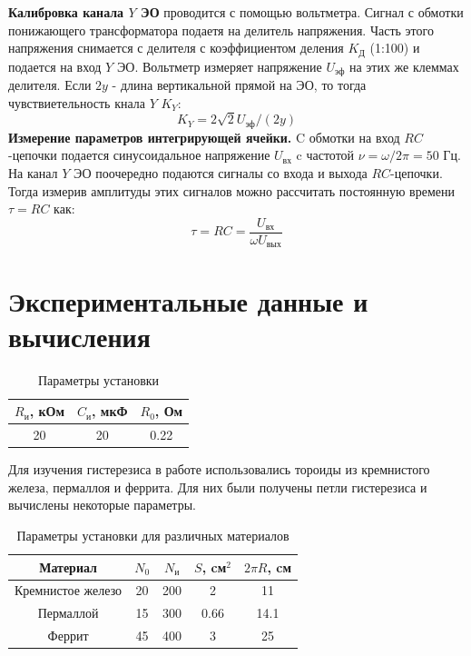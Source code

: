\indent \textbf{Калибровка канала $Y$ ЭО} проводится с помощью вольтметра. Сигнал с обмотки понижающего трансформатора подаетя на делитель напряжения. Часть этого напряжения снимается с делителя с коэффициентом деления $K_{Д}$ (1:100) и подается на вход $Y$ ЭО. Вольтметр измеряет напряжение $U_{\text{эф}}$ на этих же клеммах делителя. Если $2y$ - длина вертикальной прямой на ЭО, то тогда чувствиетельность кнала $Y$ $K_Y$:
\begin{equation}
    K_Y = 2\sqrt{2}U_{\text{эф}}/(2y) \label{eq:Ky}
\end{equation}
\indent \textbf{Измерение параметров интегрирующей ячейки.} C обмотки на вход $RC$-цепочки подается синусоидальное напряжение $U_{\text{вх}}$ c частотой $\nu = \omega / 2\pi = 50$ Гц. На канал $Y$ ЭО поочередно подаются сигналы со входа и выхода $RC$-цепочки. Тогда измерив амплитуды этих сигналов можно рассчитать постоянную времени $\tau = RC$ как:
\begin{equation}
    \tau = RC = \frac{U_{\text{вх}}}{\omega U_{\text{вых}}} \label{eq:tau}
\end{equation}
\section*{Экспериментальные данные и вычисления}

\begin{table}
    \centering 
    \begin{tabular}{|c|c|c|}
        \hline
        $R_{\text{и}}$, кОм & $C_{\text{и}}$, мкФ & $R_0$, Ом \\\hline 
        20 & 20 & 0.22\\\hline
    \end{tabular}
    \caption{Параметры установки}
\end{table}

\indent Для изучения гистерезиса в работе использовались тороиды из кремнистого железа, пермаллоя и феррита. Для них были получены петли гистерезиса и вычислены некоторые параметры. 
\\
\begin{table}[h!]
    \centering
    \begin{tabular}{|c|c|c|c|c|}
        \hline
        Материал            & $N_0$ & $N_{\text{и}}$& $S$, cм$^2$& $2\pi R$, cм  \\\hline 
        Кремнистое железо   & 20    & 200           & 2          & 11            \\\hline
        Пермаллой           & 15    & 300           & 0.66       & 14.1          \\\hline
        Феррит              & 45    & 400           & 3          & 25            \\\hline
    \end{tabular}
    \caption{Параметры установки для различных материалов}
\end{table}

